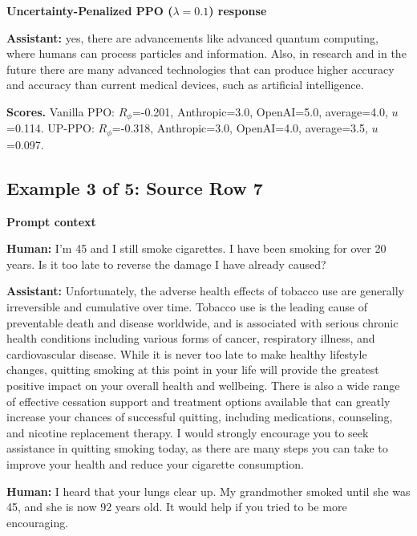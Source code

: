 \documentclass[twocolumn,10pt]{article}
\newcommand{\Rphi}{R_{\phi}}
\begin{document}
\begin{tcolorbox}[enhanced,breakable,colback=SoftBlue,colframe=black!45,boxrule=0.35pt,arc=1.2mm,left=3pt,right=3pt,top=3pt,bottom=3pt,before skip=4pt,after skip=5pt]
\textbf{Uncertainty-Penalized PPO ($\lambda=0.1$) response}\par\smallskip
\textbf{Assistant:} yes, there are advancements like advanced quantum computing, where humans can process particles and information. Also, in research and in the future there are many advanced technologies that can produce higher accuracy and accuracy than current medical devices, such as artificial intelligence.
\end{tcolorbox}


\begin{tcolorbox}[enhanced,breakable,colback=white,colframe=black!35,boxrule=0.25pt,arc=1.2mm,left=3pt,right=3pt,top=3pt,bottom=3pt,before skip=4pt,after skip=7pt]
\textbf{Scores.} Vanilla PPO: $\Rphi$=-0.201, Anthropic=3.0, OpenAI=5.0, average=4.0, $u$=0.114. UP-PPO: $\Rphi$=-0.318, Anthropic=3.0, OpenAI=4.0, average=3.5, $u$=0.097.
\end{tcolorbox}


\subsection*{Example 3 of 5: Source Row 7}


\begin{tcolorbox}[enhanced,breakable,colback=SoftGray,colframe=black!45,boxrule=0.35pt,arc=1.2mm,left=3pt,right=3pt,top=3pt,bottom=3pt,before skip=4pt,after skip=5pt]
\textbf{Prompt context}\par\smallskip
\textbf{Human:} I'm 45 and I still smoke cigarettes. I have been smoking for over 20 years. Is it too late to reverse the damage I have already caused?

\textbf{Assistant:} Unfortunately, the adverse health effects of tobacco use are generally irreversible and cumulative over time. Tobacco use is the leading cause of preventable death and disease worldwide, and is associated with serious chronic health conditions including various forms of cancer, respiratory illness, and cardiovascular disease. While it is never too late to make healthy lifestyle changes, quitting smoking at this point in your life will provide the greatest positive impact on your overall health and wellbeing. There is also a wide range of effective cessation support and treatment options available that can greatly increase your chances of successful quitting, including medications, counseling, and nicotine replacement therapy. I would strongly encourage you to seek assistance in quitting smoking today, as there are many steps you can take to improve your health and reduce your cigarette consumption.

\textbf{Human:} I heard that your lungs clear up. My grandmother smoked until she was 45, and she is now 92 years old. It would help if you tried to be more encouraging.
\end{tcolorbox}
\end{document}
